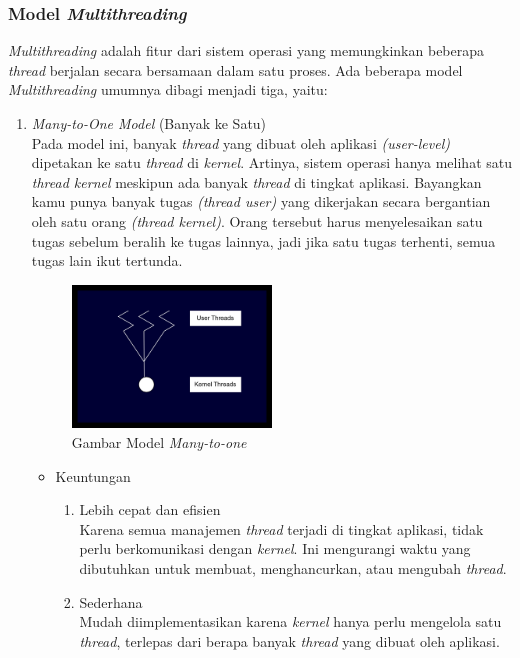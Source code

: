 \documentclass[12pt]{article}
\begin{document}
\subsubsection{Model \textit{Multithreading}}
\textit{Multithreading} adalah fitur dari sistem operasi yang memungkinkan beberapa \textit{thread} berjalan secara bersamaan dalam satu proses.
Ada beberapa model \textit{Multithreading} umumnya dibagi menjadi tiga, yaitu:
\begin{enumerate}
    \item \textit{Many-to-One Model} (Banyak ke Satu)\\
    Pada model ini, banyak \textit{thread} yang dibuat oleh aplikasi \textit{(user-level)} dipetakan ke satu \textit{thread} di \textit{kernel}. Artinya, sistem operasi hanya melihat satu \textit{thread kernel} meskipun ada banyak \textit{thread} di tingkat aplikasi.
    Bayangkan kamu punya banyak tugas \textit{(thread user)} yang dikerjakan secara bergantian oleh satu orang \textit{(thread kernel)}. Orang tersebut harus menyelesaikan satu tugas sebelum beralih ke tugas lainnya, jadi jika satu tugas terhenti, semua tugas lain ikut tertunda.
    \begin{figure}[h]
        \centering
        \includegraphics[width=0.5\textwidth]{asset/gambar-model-multithreading-many-to-one.jpg}
        \caption{Gambar Model \textit{Many-to-one}}
    \end{figure}
    \begin{itemize}
        \item Keuntungan \\
            \begin{enumerate}
                \item Lebih cepat dan efisien \\
                    Karena semua manajemen \textit{thread} terjadi di tingkat aplikasi, tidak perlu 
                    berkomunikasi dengan \textit{kernel}. Ini mengurangi waktu yang dibutuhkan untuk membuat, menghancurkan, atau mengubah \textit{thread}.
                \item Sederhana \\
                    Mudah diimplementasikan karena \textit{kernel} hanya perlu mengelola satu \textit{thread}, terlepas dari berapa banyak \textit{thread} yang 
                    dibuat oleh aplikasi.
            \end{enumerate}


\end{itemize}
\end{enumerate}
\end{document}
